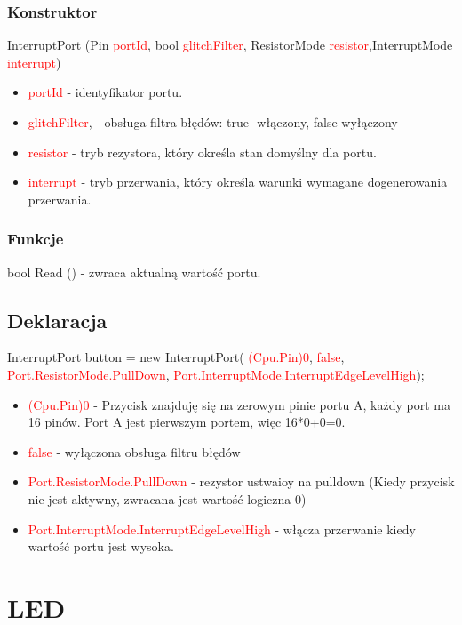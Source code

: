 \documentclass{article}
\begin{document}
\subsubsection{Konstruktor}
 InterruptPort (Pin \textcolor{red}{portId}, bool \textcolor{red}{glitchFilter}, ResistorMode \textcolor{red}{resistor},\newline InterruptMode \textcolor{red}{interrupt})
\begin{itemize}
\item \textcolor{red}{portId} - identyfikator portu.
\item \textcolor{red}{glitchFilter}, - obsługa filtra błędów: true -włączony, false-wyłączony
\item \textcolor{red}{resistor} - tryb rezystora, który określa stan domyślny dla portu.
\item \textcolor{red}{interrupt} - tryb przerwania, który określa warunki wymagane do\newline generowania przerwania.
\end{itemize}
\subsubsection{Funkcje}
bool Read () - zwraca aktualną wartość portu.

\subsection{Deklaracja}
InterruptPort button = 
new InterruptPort(\space \textcolor{red}{ (Cpu.Pin)0}, \space \textcolor{red}{ false},\space \textcolor{red}{ Port.ResistorMode.PullDown}, \space \textcolor{red}{ Port.InterruptMode.InterruptEdgeLevelHigh});
\begin{itemize}
\item \textcolor{red}{(Cpu.Pin)0} - Przycisk znajduję się na zerowym pinie portu A, każdy port ma 16 pinów. Port A jest pierwszym portem, więc 16*0+0=0.
\item \textcolor{red}{false} - wyłączona obsługa filtru błędów
\item \textcolor{red}{Port.ResistorMode.PullDown} - rezystor ustwaioy na pulldown (Kiedy przycisk nie jest aktywny, zwracana jest wartość logiczna 0)
\item \textcolor{red}{Port.InterruptMode.InterruptEdgeLevelHigh} - włącza przerwanie kiedy wartość portu jest wysoka.
\end{itemize}

\section{LED}
\end{document}

